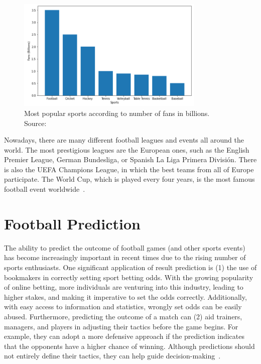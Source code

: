 \documentclass[thesis=M,english]{FITthesis}[2019/12/23]
\begin{document}
\begin{figure}[h]
    \centering
    \includegraphics[width=0.8\textwidth]{figures/sports.png}
    \caption{Most popular sports according to number of fans in billions. Source:~\cite{sports}}
    \label{fig:sports}
\end{figure}

Nowadays, there are many different football leagues and events all around the world. The most prestigious leagues are the European ones, such as the English Premier League, German Bundesliga, or Spanish La Liga Primera División. There is also the UEFA Champions League, in which the best teams from all of Europe participate. The World Cup, which is played every four years, is the most famous football event worldwide~\cite{leagues}.

\section{Football Prediction}
The ability to predict the outcome of football games (and other sports events) has become increasingly important in recent times due to the rising number of sports enthusiasts. One significant application of result prediction is (1) the use of bookmakers in correctly setting sport betting odds. With the growing popularity of online betting, more individuals are venturing into this industry, leading to higher stakes, and making it imperative to set the odds correctly. Additionally, with easy access to information and statistics, wrongly set odds can be easily abused. Furthermore, predicting the outcome of a match can (2) aid trainers, managers, and players in adjusting their tactics before the game begins. For example, they can adopt a more defensive approach if the prediction indicates that the opponents have a higher chance of winning. Although predictions should not entirely define their tactics, they can help guide decision-making~\cite{football_prediction}.
\end{document}
